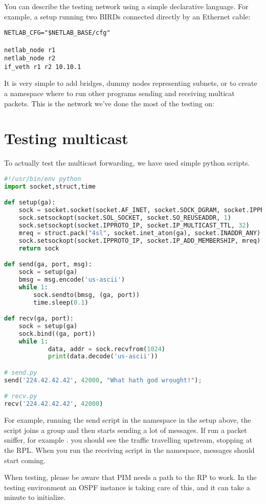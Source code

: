 You can describe the testing network using a simple declarative language. For
example, a setup running two BIRDs connected directly by an Ethernet cable:

\begin{lstlisting}
NETLAB_CFG="$NETLAB_BASE/cfg"

netlab_node r1
netlab_node r2
if_veth r1 r2 10.10.1
\end{lstlisting}

It is very simple to add bridges, dummy nodes representing subnets, or to
create a namespace where to run other programs sending and receiving multicat
packets. This is the network we've done the most of the testing on:

\begin{figure}[htp]
\centering
\vskip 10cm
\caption{}
\label{pim-channels}
\end{figure}

\section{Testing multicast}
To actually test the multicast forwarding, we have used simple python scripts.

\begin{lstlisting}[language=python]
#!/usr/bin/env python
import socket,struct,time

def setup(ga):
    sock = socket.socket(socket.AF_INET, socket.SOCK_DGRAM, socket.IPPROTO_UDP)
    sock.setsockopt(socket.SOL_SOCKET, socket.SO_REUSEADDR, 1)
    sock.setsockopt(socket.IPPROTO_IP, socket.IP_MULTICAST_TTL, 32)
    mreq = struct.pack("4sl", socket.inet_aton(ga), socket.INADDR_ANY)
    sock.setsockopt(socket.IPPROTO_IP, socket.IP_ADD_MEMBERSHIP, mreq)
    return sock

def send(ga, port, msg):
    sock = setup(ga)
    bmsg = msg.encode('us-ascii')
    while 1:
        sock.sendto(bmsg, (ga, port))
        time.sleep(0.1)

def recv(ga, port):
    sock = setup(ga)
    sock.bind((ga, port))
    while 1:
            data, addr = sock.recvfrom(1024)
            print(data.decode('us-ascii'))

# send.py
send('224.42.42.42', 42000, "What hath god wrought!");

# recv.py
recv('224.42.42.42', 42000)
\end{lstlisting}

For example, running the send script in the  namespace in the setup
above, the script joins a group and then starts sending a lot of messages. If
run a packet sniffer, for example . you should see the traffic
travelling upstream, stopping at the RPL. When you run the receiving script in
the  namespace, messages should start coming.

When testing, please be aware that PIM needs a path to the RP to work. In the
testing environment an OSPF instance is taking care of this, and it can take
a minute to initialize.

